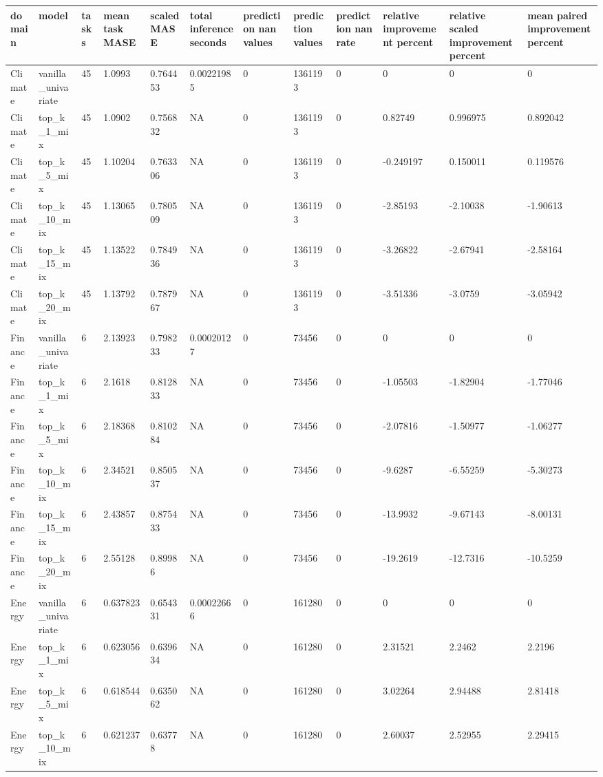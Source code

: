 \begin{tabular}{llllllllllll}
\toprule
domain & model & tasks & mean task MASE & scaled MASE & total inference seconds & prediction nan values & prediction values & prediction nan rate & relative improvement percent & relative scaled improvement percent & mean paired improvement percent \\
\midrule
Climate & vanilla\_univariate & 45 & 1.0993 & 0.764453 & 0.00221985 & 0 & 1361193 & 0 & 0 & 0 & 0 \\
Climate & top\_k\_1\_mix & 45 & 1.0902 & 0.756832 & NA & 0 & 1361193 & 0 & 0.82749 & 0.996975 & 0.892042 \\
Climate & top\_k\_5\_mix & 45 & 1.10204 & 0.763306 & NA & 0 & 1361193 & 0 & -0.249197 & 0.150011 & 0.119576 \\
Climate & top\_k\_10\_mix & 45 & 1.13065 & 0.780509 & NA & 0 & 1361193 & 0 & -2.85193 & -2.10038 & -1.90613 \\
Climate & top\_k\_15\_mix & 45 & 1.13522 & 0.784936 & NA & 0 & 1361193 & 0 & -3.26822 & -2.67941 & -2.58164 \\
Climate & top\_k\_20\_mix & 45 & 1.13792 & 0.787967 & NA & 0 & 1361193 & 0 & -3.51336 & -3.0759 & -3.05942 \\
Finance & vanilla\_univariate & 6 & 2.13923 & 0.798233 & 0.00020127 & 0 & 73456 & 0 & 0 & 0 & 0 \\
Finance & top\_k\_1\_mix & 6 & 2.1618 & 0.812833 & NA & 0 & 73456 & 0 & -1.05503 & -1.82904 & -1.77046 \\
Finance & top\_k\_5\_mix & 6 & 2.18368 & 0.810284 & NA & 0 & 73456 & 0 & -2.07816 & -1.50977 & -1.06277 \\
Finance & top\_k\_10\_mix & 6 & 2.34521 & 0.850537 & NA & 0 & 73456 & 0 & -9.6287 & -6.55259 & -5.30273 \\
Finance & top\_k\_15\_mix & 6 & 2.43857 & 0.875433 & NA & 0 & 73456 & 0 & -13.9932 & -9.67143 & -8.00131 \\
Finance & top\_k\_20\_mix & 6 & 2.55128 & 0.89986 & NA & 0 & 73456 & 0 & -19.2619 & -12.7316 & -10.5259 \\
Energy & vanilla\_univariate & 6 & 0.637823 & 0.654331 & 0.00022666 & 0 & 161280 & 0 & 0 & 0 & 0 \\
Energy & top\_k\_1\_mix & 6 & 0.623056 & 0.639634 & NA & 0 & 161280 & 0 & 2.31521 & 2.2462 & 2.2196 \\
Energy & top\_k\_5\_mix & 6 & 0.618544 & 0.635062 & NA & 0 & 161280 & 0 & 3.02264 & 2.94488 & 2.81418 \\
Energy & top\_k\_10\_mix & 6 & 0.621237 & 0.63778 & NA & 0 & 161280 & 0 & 2.60037 & 2.52955 & 2.29415 \\

\end{tabular}
